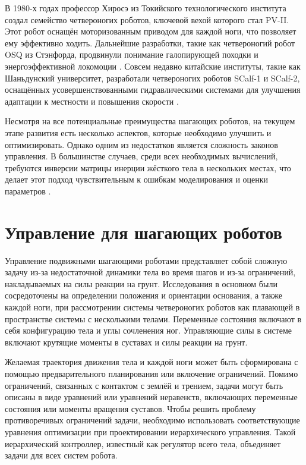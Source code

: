 В 1980-х годах профессор Хиросэ из Токийского технологического института создал семейство четвероногих роботов, ключевой вехой которого стал PV-II. Этот робот оснащён моторизованным приводом для каждой ноги, что позволяет ему эффективно ходить\cite{Hirose2009}. Дальнейшие разработки, такие как четвероногий робот OSQ из Стэнфорда, продвинули понимание галопирующей походки и энергоэффективной локомоции \cite{Nichol2004}.  Совсем недавно китайские институты, такие как Шаньдунский университет, разработали четвероногих роботов SCalf-1 и SCalf-2, оснащённых усовершенствованными гидравлическими системами для улучшения адаптации к местности и повышения скорости \cite{Rong2012}.

Несмотря на все потенциальные преимущества шагающих роботов, на текущем этапе развития есть несколько аспектов, которые необходимо улучшить и оптимизировать. Однако одним из недостатков является сложность законов управления. В большинстве случаев, среди всех необходимых вычислений, требуются инверсии матрицы инерции жёсткого тела в нескольких местах, что делает этот подход чувствительным к ошибкам моделирования и оценки параметров \cite{Nakanishi_IJRR_2008}. 

\section{Управление для шагающих роботов}\label{sec:ch1/sec2}

Управление подвижными шагающими роботами представляет собой сложную задачу из-за недостаточной динамики тела во время шагов и из-за ограничений, накладываемых на силы реакции на грунт. Исследования в основном были сосредоточены на определении положения и ориентации основания, а также каждой ноги, при рассмотрении системы четвероногих роботов как плавающей в пространстве системы с несколькими телами. Переменные состояния включают в себя конфигурацию тела и углы сочленения ног. Управляющие силы в системе включают крутящие моменты в суставах и силы реакции на грунт.

Желаемая траектория движения тела и каждой ноги может быть сформирована с помощью предварительного планирования или включение ограничений. Помимо ограничений, связанных с контактом с землёй и трением, задачи могут быть описаны в виде уравнений или уравнений неравенств, включающих переменные состояния или моменты вращения суставов. Чтобы решить проблему противоречивых ограничений задачи, необходимо использовать соответствующие уравнения оптимизации при проектировании иерархического управления. Такой иерархический контроллер, известный как регулятор всего тела,\cite{fahmi2019passive} объединяет задачи для всех систем робота. 

